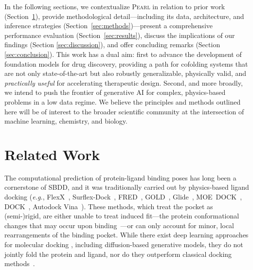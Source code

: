 \documentclass[11pt, letterpaper, onecolumn]{tau-class/tau}
\newcommand{\pearl}{\textsc{Pearl}\xspace}
\newcommand{\eg}{\textit{e.g.}\xspace}
\begin{document}
In the following sections, we contextualize \pearl in relation to prior work (Section~\ref{sec:related-work}), provide methodological detail---including its data, architecture, and inference strategies (Section~\ref{sec:methods})---present a comprehensive performance evaluation (Section~\ref{sec:results}), discuss the implications of our findings (Section \ref{sec:discussion}), and offer concluding remarks (Section \ref{sec:conclusion}).
This work has a dual aim: first to advance the development of foundation models for drug discovery, providing a path for cofolding systems that are not only state-of-the-art but also robustly generalizable, physically valid, and \emph{practically useful} for accelerating therapeutic design.
Second, and more broadly, we intend to push the frontier of generative AI for complex, physics-based problems in a low data regime.
We believe the principles and methods outlined here will be of interest to the broader scientific community at the intersection of machine learning, chemistry, and biology.


\section{Related Work}
\label{sec:related-work}

The computational prediction of protein-ligand binding poses has long been a cornerstone of SBDD, and it was traditionally carried out by physics-based ligand docking \cite{docking-review} (\eg,
FlexX~\cite{rarey_fast_1996},
Surflex-Dock~\cite{surflex},
FRED~\cite{mcgann_gaussian_2003},
GOLD~\cite{gold},
Glide~\cite{friesner_glide_2004},
MOE~DOCK~\cite{corbeil_variability_2012},
DOCK~\cite{venkatraman_flexible_2012},
Autodock Vina~\cite{AutoDockVina}).
These methods, which treat the pocket as (semi-)rigid, are either unable to treat induced fit---the protein conformational changes that may occur upon binding~\cite{inducedfit1,inducedfit2,miller2021inducedfitdocking}---or can only account for minor, local rearrangements of the binding pocket.
While there exist deep learning approaches for molecular docking \cite{corso2022diffdock,lee_genmol_2025}, including diffusion-based generative models, they do not jointly fold the protein and ligand, nor do they outperform classical docking methods~\cite{buttenschoen2024posebusters}.
\end{document}
